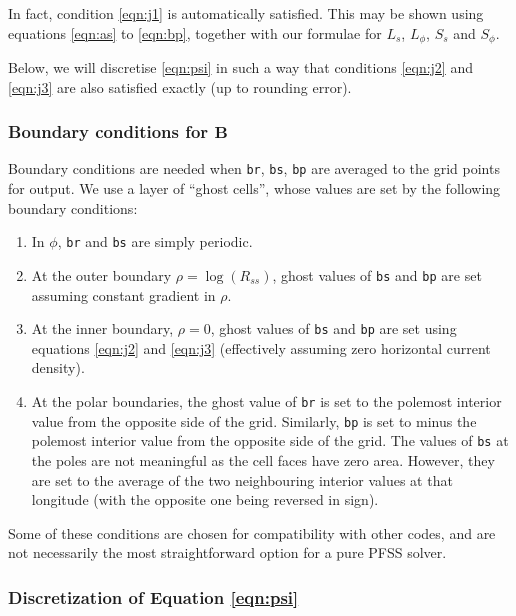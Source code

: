 \documentclass[11pt]{article}
\newcommand{\Bb}{\boldsymbol{B}}
\begin{document}
In fact, condition \eqref{eqn:j1} is automatically satisfied. This may be shown using equations \eqref{eqn:as} to \eqref{eqn:bp}, together with our formulae for $L_s$, $L_\phi$, $S_s$ and $S_\phi$.

Below, we will discretise \eqref{eqn:psi} in such a way that conditions \eqref{eqn:j2} and \eqref{eqn:j3} are also satisfied exactly (up to rounding error).

\subsubsection{Boundary conditions for $\Bb$}

Boundary conditions are needed when \texttt{br}, \texttt{bs}, \texttt{bp} are averaged to the grid points for output. We use a layer of ``ghost cells'', whose values are set by the following boundary conditions:
\begin{enumerate}
\item In $\phi$, \texttt{br} and \texttt{bs} are simply periodic.
\item At the outer boundary $\rho=\log(R_{ss})$, ghost values of \texttt{bs} and \texttt{bp} are set assuming constant gradient in $\rho$.
\item At the inner boundary, $\rho=0$, ghost values of \texttt{bs} and \texttt{bp} are set using equations \eqref{eqn:j2} and \eqref{eqn:j3} (effectively assuming zero horizontal current density).
\item At the polar boundaries, the ghost value of \texttt{br} is set to the polemost interior value from the opposite side of the grid. Similarly, \texttt{bp} is set to minus the polemost interior value from the opposite side of the grid. The values of \texttt{bs} at the poles are not meaningful as the cell faces have zero area. However, they are set to the average of the two neighbouring interior values at that longitude (with the opposite one being reversed in sign).
\end{enumerate}
Some of these conditions are chosen for compatibility with other codes, and are not necessarily the most straightforward option for a pure PFSS solver.

\subsubsection{Discretization of Equation \eqref{eqn:psi}}
\end{document}
